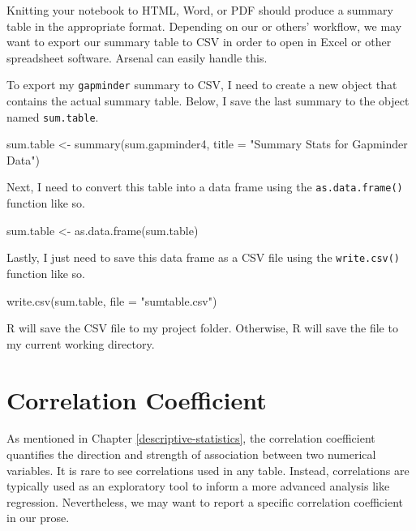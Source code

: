 \documentclass[
]{book}
\makeatletter
\newenvironment{Shaded}{\begin{snugshade}}{\end{snugshade}}
\newcommand{\AttributeTok}[1]{\textcolor[rgb]{0.61,0.61,0.61}{#1}}
\newcommand{\FunctionTok}[1]{\textcolor[rgb]{0,0,0}{#1}}
\newcommand{\NormalTok}[1]{#1}
\newcommand{\OtherTok}[1]{\textcolor[rgb]{0.37,0.37,0.37}{#1}}
\newcommand{\StringTok}[1]{\textcolor[rgb]{0.5,0.5,0.5}{#1}}
\newenvironment{kframe}{%
\medskip{}
\setlength{\fboxsep}{.8em}
 \def\at@end@of@kframe{}%
 \ifinner\ifhmode%
  \def\at@end@of@kframe{\end{minipage}}%
  \begin{minipage}{\columnwidth}%
 \fi\fi%
 \def\FrameCommand##1{\hskip\@totalleftmargin \hskip-\fboxsep
 \colorbox{shadecolor}{##1}\hskip-\fboxsep
     \hskip-\linewidth \hskip-\@totalleftmargin \hskip\columnwidth}%
 \MakeFramed {\advance\hsize-\width
   \@totalleftmargin\z@ \linewidth\hsize
   \@setminipage}}%
 {\par\unskip\endMakeFramed%
 \at@end@of@kframe}
\renewenvironment{Shaded}{\begin{kframe}}{\end{kframe}}
\makeatother
\begin{document}
Knitting your notebook to HTML, Word, or PDF should produce a summary table in the appropriate format. Depending on our or others' workflow, we may want to export our summary table to CSV in order to open in Excel or other spreadsheet software. Arsenal can easily handle this.

To export my \texttt{gapminder} summary to CSV, I need to create a new object that contains the actual summary table. Below, I save the last summary to the object named \texttt{sum.table}.

\begin{Shaded}
\begin{Highlighting}[]
\NormalTok{sum.table }\OtherTok{\textless{}{-}} \FunctionTok{summary}\NormalTok{(sum.gapminder4, }\AttributeTok{title =} \StringTok{"Summary Stats for Gapminder Data"}\NormalTok{)}
\end{Highlighting}
\end{Shaded}

Next, I need to convert this table into a data frame using the \texttt{as.data.frame()} function like so.

\begin{Shaded}
\begin{Highlighting}[]
\NormalTok{sum.table }\OtherTok{\textless{}{-}} \FunctionTok{as.data.frame}\NormalTok{(sum.table)}
\end{Highlighting}
\end{Shaded}

Lastly, I just need to save this data frame as a CSV file using the \texttt{write.csv()} function like so.

\begin{Shaded}
\begin{Highlighting}[]
\FunctionTok{write.csv}\NormalTok{(sum.table, }\AttributeTok{file =} \StringTok{"sumtable.csv"}\NormalTok{)}
\end{Highlighting}
\end{Shaded}

R will save the CSV file to my project folder. Otherwise, R will save the file to my current working directory.

\hypertarget{correlation-coefficient}{%
\section{Correlation Coefficient}\label{correlation-coefficient}}

As mentioned in Chapter \ref{descriptive-statistics}, the correlation coefficient quantifies the direction and strength of association between two numerical variables. It is rare to see correlations used in any table. Instead, correlations are typically used as an exploratory tool to inform a more advanced analysis like regression. Nevertheless, we may want to report a specific correlation coefficient in our prose.
\end{document}
